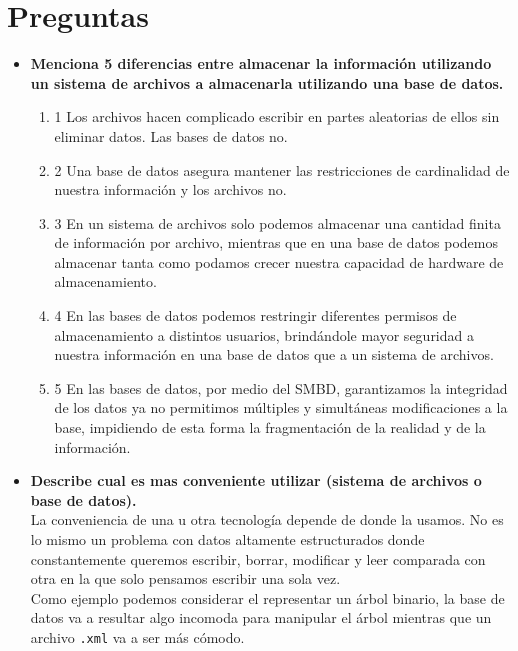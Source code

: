 \documentclass[12pt,a4paper]{article}
\begin{document}
\section{Preguntas}
\begin{itemize}
	\item \textbf{Menciona 5 diferencias entre almacenar la información
		utilizando un sistema de archivos a almacenarla utilizando una base de datos.}\\
		\begin{enumerate}
			\item 1 Los archivos hacen complicado escribir en partes aleatorias de ellos
				sin eliminar datos. Las bases de datos no.\\

			\item 2 Una base de datos asegura mantener las restricciones de cardinalidad
				de nuestra información y los archivos no.\\

			\item 3 En un sistema de archivos solo podemos almacenar una cantidad finita 
			de información por archivo, mientras que en una base de datos podemos 
			almacenar tanta como podamos crecer nuestra capacidad de hardware de
			almacenamiento. \\
			\item 4 En las bases de datos podemos restringir diferentes permisos de 
			almacenamiento a distintos usuarios, brindándole mayor seguridad a nuestra 
			información en una base de datos que a un sistema de archivos. \\
			\item 5 En las bases de datos, por medio del SMBD, garantizamos la integridad 
			de los datos ya no permitimos múltiples y simultáneas modificaciones a la base, 
			impidiendo de esta forma la fragmentación de la realidad y de la información. \\
		\end{enumerate}


	\item \textbf{Describe cual es mas conveniente utilizar (sistema de archivos o base de datos).}\\

		La conveniencia de una u otra tecnología depende de donde la usamos.
		No es lo mismo un problema con datos altamente estructurados donde
		constantemente queremos escribir, borrar, modificar y leer comparada
		con otra en la que solo pensamos escribir una sola vez.\\

		Como ejemplo podemos considerar el representar un árbol binario, la base de
		datos va a resultar algo incomoda para manipular el árbol mientras
		que un archivo \texttt{.xml} va a ser más cómodo.\\
\end{itemize}
\end{document}
